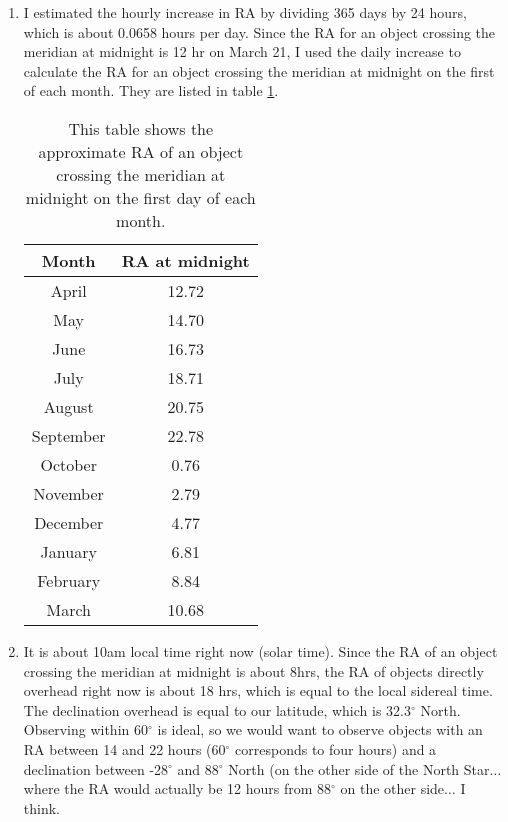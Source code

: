 \documentclass[12pt]{article}
\begin{document}
\begin{enumerate}[1.]
    \item I estimated the hourly increase in RA by dividing 365 days
    by 24 hours, which is about 0.0658 hours per day.
    Since the RA for an object crossing the meridian at midnight
    is 12 hr on March 21, I used the daily increase to calculate the
    RA for an object crossing the meridian at midnight on the first of
    each month. They are listed in table \ref{table:RA}.

        \begin{table}[h]
        \centering
        \begin{tabular}{c c}
        \hline\hline
        Month & RA at midnight\\
        \hline
        April & 12.72\\
        May & 14.70\\
        June & 16.73\\
        July & 18.71\\
        August & 20.75\\
        September & 22.78\\
        October & 0.76\\
        November & 2.79\\
        December & 4.77\\
        January & 6.81\\
        February & 8.84\\
        March & 10.68\\
        \hline
        \end{tabular}
        \caption{This table shows the approximate RA of an object
        crossing the meridian at midnight on the first day of each month.}
        \label{table:RA}
        \end{table}

    \item It is about 10am local time right now (solar time).
    Since the RA of an
    object crossing the meridian at midnight is about 8hrs, the RA of
    objects directly overhead right now is about 18 hrs, which is
    equal to the local sidereal time. The declination overhead is
    equal to our latitude, which is 32.3$^{\circ}$ North.
    Observing within 60$^{\circ}$ is ideal, so we would want to
    observe objects with an RA between 14 and 22 hours (60$^{\circ}$
    corresponds to four hours) and a declination between -28$^{\circ}$
    and 88$^{\circ}$ North (on the other side of the North
    Star$\ldots$ where the RA would actually be 12 hours from
    88$^{\circ}$ on the other side$\ldots$ I think.


\end{enumerate}
\end{document}
